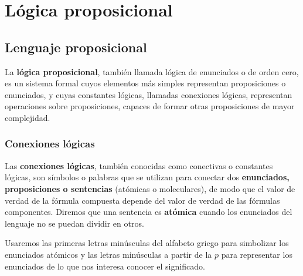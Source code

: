 \newpage
\section{Lógica proposicional}
\subsection{Lenguaje proposicional}
La \textbf{lógica proposicional}, también llamada lógica de enunciados o de orden cero, es un sistema formal cuyos elementos más simples representan proposiciones o enunciados, y cuyas constantes lógicas, llamadas conexiones lógicas, representan operaciones sobre proposiciones, capaces de formar otras proposiciones de mayor complejidad.

\subsubsection{Conexiones lógicas}
Las \textbf{conexiones lógicas}, también conocidas como conectivas o constantes lógicas, son símbolos o palabras que se utilizan para conectar dos \textbf{enunciados, proposiciones o sentencias} (atómicas o moleculares), de modo que el valor de verdad de la fórmula compuesta depende del valor de verdad de las fórmulas componentes.
Diremos que una sentencia es \textbf{atómica} cuando los enunciados del lenguaje no se puedan dividir en otros.
\begin{nota}
    Usaremos las primeras letras minúsculas del alfabeto griego para simbolizar los enunciados atómicos y las letras minúsculas a partir de la $p$ para representar los enunciados de lo que nos interesa conocer el significado.
\end{nota}

